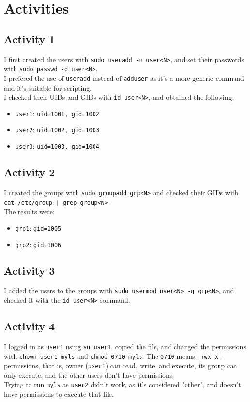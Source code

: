 \section*{Activities}

\subsection*{Activity 1}
I first created the users with \texttt{sudo useradd -m user<N>}, and set their passwords with \texttt{sudo passwd -d user<N>}.\\
I prefered the use of \texttt{useradd} instead of \texttt{adduser} as it's a more generic command and it's suitable for scripting.\\

I checked their UIDs and GIDs with \texttt{id user<N>}, and obtained the following:
\begin{itemize}
    \item \texttt{user1}: \texttt{uid=1001, gid=1002}
    \item \texttt{user2}: \texttt{uid=1002, gid=1003}
    \item \texttt{user3}: \texttt{uid=1003, gid=1004}
\end{itemize}

\subsection*{Activity 2}
I created the groups with \texttt{sudo groupadd grp<N>} and checked their GIDs with \texttt{cat /etc/group | grep group<N>}.\\
The results were:
\begin{itemize}
    \item \texttt{grp1}: \texttt{gid=1005}
    \item \texttt{grp2}: \texttt{gid=1006}
\end{itemize}

\subsection*{Activity 3}
I added the users to the groups with \texttt{sudo usermod user<N> -g grp<N>}, and checked it with the \texttt{id user<N>} command.

\subsection*{Activity 4}
I logged in as \texttt{user1} using \texttt{su user1}, copied the file, and changed the permissions with \texttt{chown user1 myls} and \texttt{chmod 0710 myls}. The \texttt{0710} means \texttt{-rwx--x---} permissions, that is, owner (\texttt{user1}) can read, write, and execute, its group can only execute, and the other users don't have permissions.\\
Trying to run \texttt{myls} as \texttt{user2} didn't work, as it's considered "other", and doesn't have permissions to execute that file.\\

